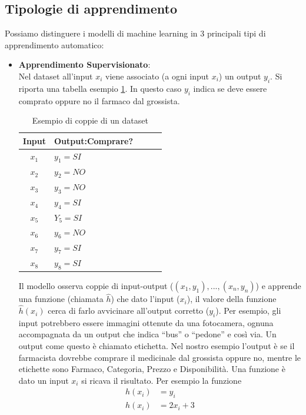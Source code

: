 \subsection{Tipologie di apprendimento}
Possiamo distinguere i modelli di machine learning in 3 principali tipi di apprendimento automatico:
\begin{itemize}
    \item \textbf{Apprendimento Supervisionato}:\\
    Nel dataset all'input $x_i$ viene associato (a ogni input $x_i$) un output $y_i$. Si riporta una tabella esempio \ref{tab:coppie_dataset_farmacia}. 
    In questo caso $y_i$ indica se deve essere comprato oppure no il farmaco dal grossista.
    \begin{table}[H]
    \centering
    \begin{tabular}{|c|l|l|c|c|}
    \hline
    \textbf{Input} & \textbf{Output}:Comprare?\\
    \hline
    $x_1$ & $y_1=SI$ \\
    $x_2$ & $y_2=NO$ \\
    $x_3$ & $y_3=NO$ \\
    $x_4$ & $y_4=SI$ \\
    $x_5$ & $Y_5=SI$ \\
    $x_6$ & $y_6=NO$ \\
    $x_7$ & $y_7=SI$ \\
    $x_8$ & $y_8=SI$ \\
    \hline
    \end{tabular}
    \caption{Esempio di coppie di un dataset}
    \label{tab:coppie_dataset_farmacia}
    \end{table}
    Il modello osserva coppie di input-output ($(x_1,y_1),...,(x_n,y_n)$) e apprende una funzione (chiamata $\hat{h}$) che dato l'input ($x_i$), il valore della funzione $\hat{h}(x_i)$ cerca di farlo avvicinare all'output corretto ($y_i$). Per esempio, gli input potrebbero essere
    immagini ottenute da una fotocamera, ognuna accompagnata da un output che indica “bus”
    o “pedone” e così via. Un output come questo è chiamato etichetta. Nel nostro esempio l'output è se il farmacista dovrebbe comprare il medicinale dal grossista oppure no, mentre le etichette sono Farmaco, Categoria, Prezzo e Disponibilità.
    Una funzione è dato un input $x_i$ si ricava il risultato. Per esempio la funzione
    \begin{align}
        h(x_i)&=y_i\\
        h(x_i)&=2x_i+3\\

\end{align}
\end{itemize}
